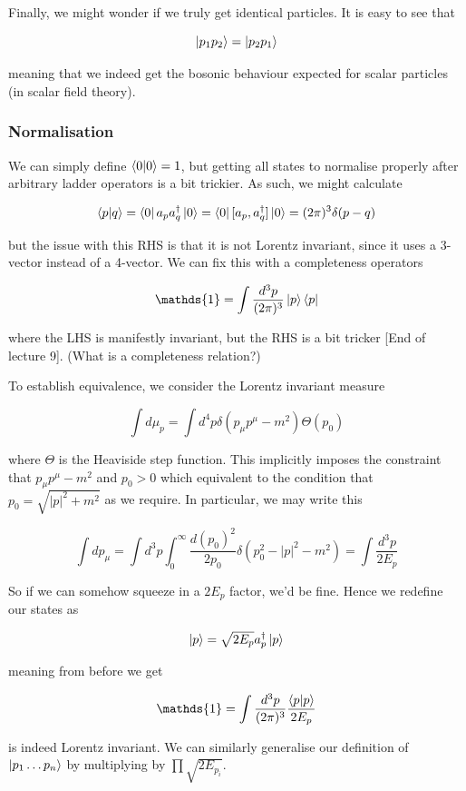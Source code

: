 \documentclass{article}
\theoremstyle{definition}
\begin{document}
Finally, we might wonder if we truly get identical particles. It is easy to see
that

$$ \ket{p_1 p_2} = \ket{p_2 p_1} $$

meaning that we indeed get the bosonic behaviour expected for scalar particles
(in scalar field theory).

\subsubsection{Normalisation}

We can simply define $\bra{0} \ket{0} = 1$, but getting all states to normalise
properly after arbitrary ladder operators is a bit trickier. As such, we might
calculate

$$ \bra{p} \ket{q} = \bra{0} a_p a_q^\dagger \ket{0} = \bra{0} [a_p,
a_q^\dagger] \ket{0} = (2\pi)^3 \delta(p - q) $$

but the issue with this RHS is that it is not Lorentz invariant, since it uses a
3-vector instead of a 4-vector. We can fix this with a completeness operators

$$ \mathds{1} = \int \frac{d^3p}{(2\pi)^3} \ket{p} \bra{p} $$

where the LHS is manifestly invariant, but the RHS is a bit tricker [End of
lecture 9]. (What is a completeness relation?)

To establish equivalence, we consider the Lorentz invariant measure

$$ \int d\mu_p = \int d^4 p \delta(p_\mu p^\mu - m^2) \Theta(p_0) $$

where $\Theta$ is the Heaviside step function. This implicitly imposes the
constraint that $p_\mu p^\mu - m^2$ and $p_0 > 0$ which equivalent to the
condition that $p_0 = \sqrt{|p|^2 + m^2}$ as we require. In particular, we may
write this

$$ \int dp_\mu = \int d^3p \int_0^\infty \frac{d(p_0)^2}{2 p_0} \delta(p_0^2 -
|p|^2 - m^2) = \int \frac{d^3p}{2E_p} $$

So if we can somehow squeeze in a $2E_p$ factor, we'd be fine. Hence we redefine
our states as

$$ \ket{p} = \sqrt{2E_p} a_p^\dagger \ket{p} $$

meaning from before we get

$$ \mathds{1} = \int \frac{d^3p}{(2\pi)^3} \frac{\bra{p}\ket{p}}{2 E_p} $$

is indeed Lorentz invariant. We can similarly generalise our definition of
$\ket{p_1 \dots p_n}$ by multiplying by $\prod \sqrt{2E_{p_i}}$.
\end{document}
